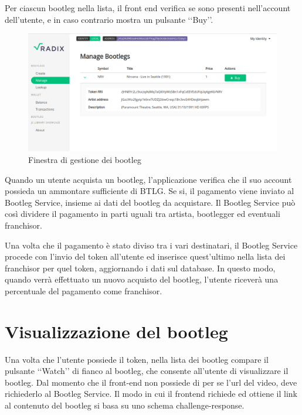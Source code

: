 Per ciascun bootleg nella lista, il front end verifica se sono presenti nell'account dell'utente, e in caso contrario mostra un pulsante ‘‘Buy’’.

\begin{figure}[H]
    \includegraphics[width=\linewidth]{images/application/manage-bootleg2.png}
    \caption{Finestra di gestione dei bootleg}
    \label{fig:manage_bootleg}
\end{figure}

Quando un utente acquista un bootleg, l'applicazione verifica che il suo account possieda un ammontare sufficiente di BTLG. Se si, il pagamento viene inviato al Bootleg Service, insieme ai dati del bootleg da acquistare. Il Bootleg Service può così dividere il pagamento in parti uguali tra artista, bootlegger ed eventuali franchisor.

Una volta che il pagamento è stato diviso tra i vari destinatari, il Bootleg Service procede con l'invio del token all'utente ed inserisce quest'ultimo nella lista dei franchisor per quel token, aggiornando i dati sul database. In questo modo, quando verrà effettuato un nuovo acquisto del bootleg, l'utente riceverà una percentuale del pagamento come franchisor. 

\section{Visualizzazione del bootleg}

Una volta che l'utente possiede il token, nella lista dei bootleg compare il pulsante ‘‘Watch’’ di fianco al bootleg, che consente all'utente di visualizzare il bootleg. Dal momento che il front-end non possiede di per se l'url del video, deve richiederlo al Bootleg Service. Il modo in cui il frontend richiede ed ottiene il link al contenuto del bootleg si basa su uno schema challenge-response. 

